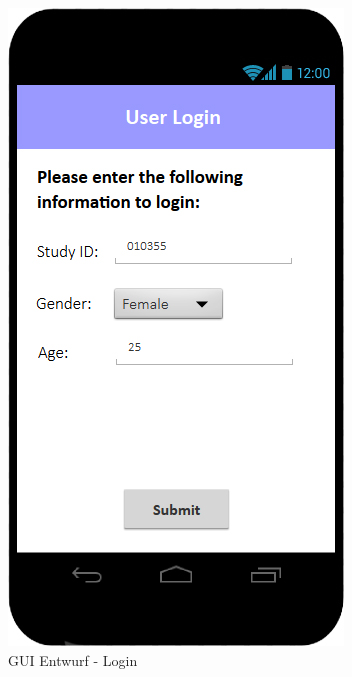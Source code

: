 \documentclass[a4paper]{scrreprt}
\begin{document}
            \vspace*{1cm}
            \begin{figure}[ht]
                \centering
                \includegraphics[scale = 0.3]{android_login.jpg}
                \caption{GUI Entwurf - Login}
            \end{figure}
\end{document}
